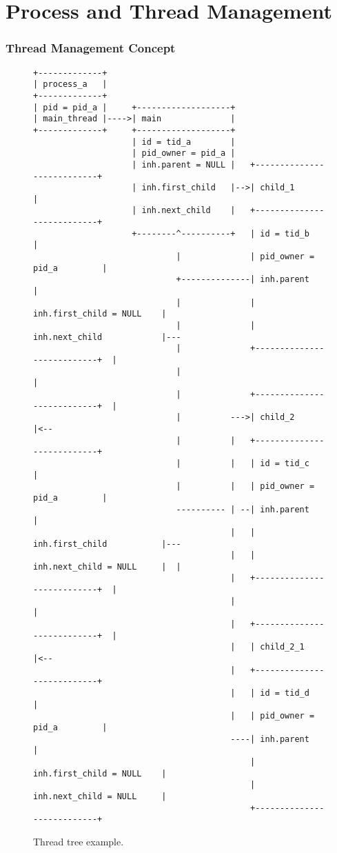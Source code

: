\part{Process and Thread Management}

\section{Thread Management Concept}

\begin{figure}
\begin{verbatim}
+-------------+
| process_a   |
+-------------+
| pid = pid_a |     +-------------------+
| main_thread |---->| main              |
+-------------+     +-------------------+
                    | id = tid_a        |
                    | pid_owner = pid_a |
                    | inh.parent = NULL |   +---------------------------+
                    | inh.first_child   |-->| child_1                   |
                    | inh.next_child    |   +---------------------------+
                    +--------^----------+   | id = tid_b                |
                             |              | pid_owner = pid_a         |
                             +--------------| inh.parent                |
                             |              | inh.first_child = NULL    |
                             |              | inh.next_child            |---
                             |              +---------------------------+  |
                             |                                             |
                             |              +---------------------------+  |
                             |          --->| child_2                   |<--
                             |          |   +---------------------------+
                             |          |   | id = tid_c                |
                             |          |   | pid_owner = pid_a         |
                             ---------- | --| inh.parent                |
                                        |   | inh.first_child           |---
                                        |   | inh.next_child = NULL     |  |
                                        |   +---------------------------+  |
                                        |                                  |
                                        |   +---------------------------+  |
                                        |   | child_2_1                 |<--
                                        |   +---------------------------+
                                        |   | id = tid_d                |
                                        |   | pid_owner = pid_a         |
                                        ----| inh.parent                |
                                            | inh.first_child = NULL    |
                                            | inh.next_child = NULL     |
                                            +---------------------------+
\end{verbatim}
\caption{Thread tree example.}
\label{figure:thtree}
\end{figure}

